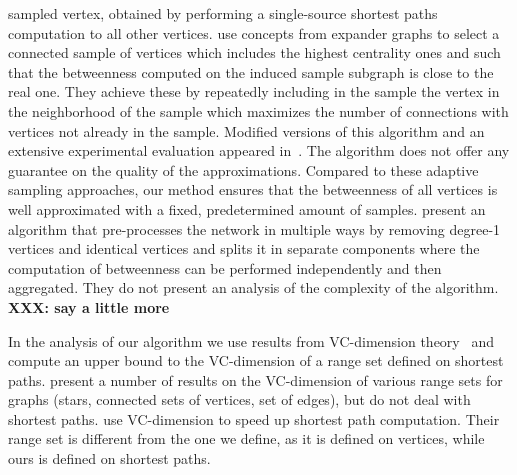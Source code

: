sampled vertex, obtained by performing a single-source shortest paths
computation to all other vertices.  \citet{MaiyaBW10} use concepts from expander
graphs to select a connected sample of vertices which includes the highest
centrality ones and such that the betweenness computed on the induced sample
subgraph is close to the real one.  They achieve these by repeatedly including
in the sample the vertex in the neighborhood of the sample which maximizes the
number of connections with vertices not already in the sample. Modified versions
of this algorithm and an extensive experimental evaluation appeared
in~\citep{LimMRTB11}. The algorithm does not offer any guarantee on the quality
of the approximations. Compared to these adaptive sampling approaches, our
method ensures that the betweenness of all vertices is well approximated with a
fixed, predetermined amount of samples.  \citep{SaryuceSKC13} present an
algorithm that pre-processes the network in multiple ways by removing degree-1
vertices and identical vertices and splits it in separate components where the
computation of betweenness can be performed independently and then aggregated.
They do not present an analysis of the complexity of the algorithm. {\bf XXX:
say a little more}

In the analysis of our algorithm we use results from VC-dimension
theory~\citep{VapnikC71} and compute an upper bound to the VC-dimension of a
range set defined on shortest paths. \citet{KranakisKRUW97} present a number of
results on the VC-dimension of various range sets for graphs (stars, connected
sets of vertices, set of edges), but do not deal with shortest paths.
\citet{AbrahamDFGW11} use VC-dimension to speed up shortest path computation.
Their range set is different from the one we define, as it is defined on
vertices, while ours is defined on shortest paths.

